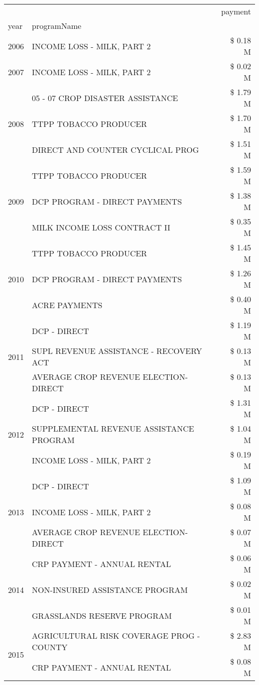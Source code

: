 \begin{tabular}{llr}
\toprule
 &  & payment \\
year & programName &  \\
\midrule
2006 & INCOME LOSS - MILK, PART 2 & \$ 0.18 M \\
\cline{1-3}
2007 & INCOME LOSS - MILK, PART 2 & \$ 0.02 M \\
\cline{1-3}
\multirow[t]{3}{*}{2008} & 05 - 07 CROP DISASTER ASSISTANCE & \$ 1.79 M \\
 & TTPP TOBACCO PRODUCER & \$ 1.70 M \\
 & DIRECT AND COUNTER CYCLICAL PROG & \$ 1.51 M \\
\cline{1-3}
\multirow[t]{3}{*}{2009} & TTPP TOBACCO PRODUCER & \$ 1.59 M \\
 & DCP PROGRAM - DIRECT PAYMENTS & \$ 1.38 M \\
 & MILK INCOME LOSS CONTRACT II & \$ 0.35 M \\
\cline{1-3}
\multirow[t]{3}{*}{2010} & TTPP TOBACCO PRODUCER & \$ 1.45 M \\
 & DCP PROGRAM - DIRECT PAYMENTS & \$ 1.26 M \\
 & ACRE PAYMENTS & \$ 0.40 M \\
\cline{1-3}
\multirow[t]{3}{*}{2011} & DCP - DIRECT & \$ 1.19 M \\
 & SUPL REVENUE ASSISTANCE - RECOVERY ACT & \$ 0.13 M \\
 & AVERAGE CROP REVENUE ELECTION-DIRECT & \$ 0.13 M \\
\cline{1-3}
\multirow[t]{3}{*}{2012} & DCP - DIRECT & \$ 1.31 M \\
 & SUPPLEMENTAL REVENUE ASSISTANCE PROGRAM & \$ 1.04 M \\
 & INCOME LOSS - MILK, PART 2 & \$ 0.19 M \\
\cline{1-3}
\multirow[t]{3}{*}{2013} & DCP - DIRECT & \$ 1.09 M \\
 & INCOME LOSS - MILK, PART 2 & \$ 0.08 M \\
 & AVERAGE CROP REVENUE ELECTION-DIRECT & \$ 0.07 M \\
\cline{1-3}
\multirow[t]{3}{*}{2014} & CRP PAYMENT - ANNUAL RENTAL & \$ 0.06 M \\
 & NON-INSURED ASSISTANCE PROGRAM & \$ 0.02 M \\
 & GRASSLANDS RESERVE PROGRAM & \$ 0.01 M \\
\cline{1-3}
\multirow[t]{3}{*}{2015} & AGRICULTURAL RISK COVERAGE PROG - COUNTY & \$ 2.83 M \\
 & CRP PAYMENT - ANNUAL RENTAL & \$ 0.08 M \\

\end{tabular}
